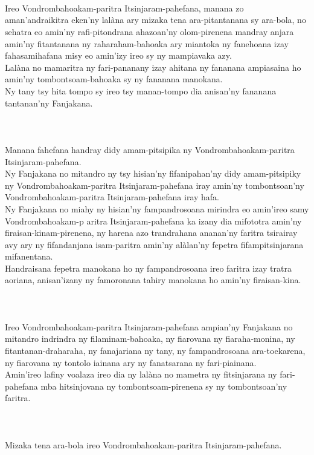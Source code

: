 \documentclass[12pt]{article}
\newcounter{laharana}
\newcommand{\andininy}[0]{
  \paragraph{%
    \NoCaseChange{%
      Andininy~\addtocounter{laharana}{1}\thelaharana.}\label{and:\thelaharana}~%
  }%
}
\begin{document}
\andininy{}Ireo Vondrombahoakam-paritra Itsinjaram-pahefana, manana zo
aman'andraikitra eken'ny lalàna ary mizaka tena ara-pitantanana sy ara-bola, no
sehatra eo amin'ny rafi-pitondrana ahazoan'ny olom-pirenena mandray anjara
amin'ny fitantanana ny raharaham-bahoaka ary miantoka ny fanehoana izay
fahasamihafana misy eo amin'izy ireo sy ny mampiavaka azy.\\

\noindent
Lalàna no mamaritra ny fari-pananany izay ahitana ny fananana ampiasaina ho
amin'ny tombontsoam-bahoaka sy ny fananana manokana.\\

\noindent
Ny tany tsy hita tompo sy ireo tsy manan-tompo dia anisan'ny fananana
tantanan'ny Fanjakana.

\andininy{}Manana fahefana handray didy amam-pitsipika ny
Vondrombahoakam-paritra Itsinjaram-pahefana.\\

\noindent
Ny Fanjakana no mitandro ny tsy hisian'ny fifanipahan'ny didy amam-pitsipiky ny
Vondrombahoakam-paritra Itsinjaram-pahefana iray amin'ny tombontsoan'ny
Vondrombahoakam-paritra Itsinjaram-pahefana iray hafa.\\

\noindent
Ny Fanjakana no miahy ny hisian'ny fampandrosoana mirindra eo amin'ireo samy
Vondrombahoakam-p aritra Itsinjaram-pahefana ka izany dia mifototra amin'ny
firaisan-kinam-pirenena, ny harena azo trandrahana ananan'ny faritra tsirairay
avy ary ny fifandanjana isam-paritra amin'ny alàlan'ny fepetra fifampitsinjarana
mifanentana.\\

\noindent
Handraisana fepetra manokana ho ny fampandrosoana ireo faritra izay tratra
aoriana, anisan'izany ny famoronana tahiry manokana ho amin'ny firaisan-kina.

\andininy{}Ireo Vondrombahoakam-paritra Itsinjaram-pahefana ampian'ny Fanjakana
no mitandro indrindra ny filaminam-bahoaka, ny fiarovana ny fiaraha-monina, ny
fitantanan-draharaha, ny fanajariana ny tany, ny fampandrosoana ara-toekarena,
ny fiarovana ny tontolo iainana ary ny fanatsarana ny fari-piainana.\\

\noindent
Amin'ireo lafiny voalaza ireo dia ny lalàna no mametra ny fitsinjarana ny
fari-pahefana mba hitsinjovana ny tombontsoam-pirenena sy ny tombontsoan'ny
faritra.

\andininy{}Mizaka tena ara-bola ireo Vondrombahoakam-paritra
Itsinjaram-pahefana.\\
\end{document}
